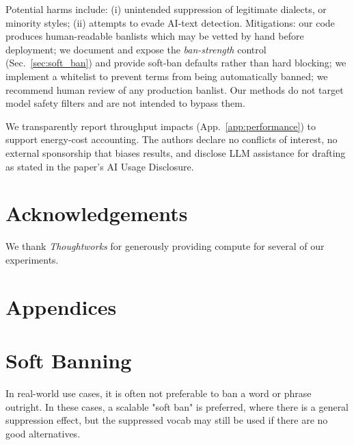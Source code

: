 \documentclass[11pt]{article}
\begin{document}
Potential harms include: (i) unintended suppression of legitimate dialects, or minority styles; (ii) attempts to evade AI-text detection. Mitigations: our code produces human-readable banlists which may be vetted by hand before deployment; we document and expose the \emph{ban-strength} control (Sec.~\ref{sec:soft_ban}) and provide soft-ban defaults rather than hard blocking; we implement a whitelist to prevent terms from being automatically banned; we recommend human review of any production banlist. Our methods do not target model safety filters and are not intended to bypass them.

We transparently report throughput impacts (App.~\ref{app:performance}) to support energy-cost accounting. The authors declare no conflicts of interest, no external sponsorship that biases results, and disclose LLM assistance for drafting as stated in the paper’s AI Usage Disclosure.


\section*{Acknowledgements}
We thank \textit{Thoughtworks} for generously providing compute for several of our experiments.







\clearpage
\section*{Appendices}
\appendix



\section{Soft Banning}
\label{app:soft-banning}

In real-world use cases, it is often not preferable to ban a word or phrase outright. In these cases, a scalable "soft ban" is preferred, where there is a general suppression effect, but the suppressed vocab may still be used if there are no good alternatives.
\end{document}
